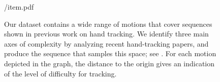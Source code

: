 \begin{figure}[t!]
\centering
\begin{overpic} 
[width=\linewidth]
{\currfiledir/item.pdf}
\end{overpic}
\caption{
% 
Our dataset contains a wide range of motions that cover sequences shown in previous work on hand tracking. We identify three main axes of complexity by analyzing recent hand-tracking papers, and produce the  sequence that samples this space; see . 
For each motion depicted in the graph, the distance to the origin gives an indication of the level of difficulty for tracking.
% 
}
\label{fig:motiontypes}
\end{figure}